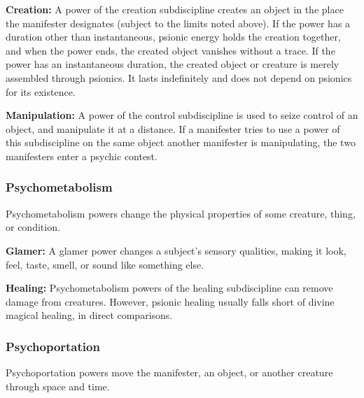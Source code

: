 \textbf{Creation:} A power of the creation subdiscipline creates an object in the place the manifester designates (subject to the limits noted above). If the power has a duration other than instantaneous, psionic energy holds the creation together, and when the power ends, the created object vanishes without a trace. If the power has an instantaneous duration, the created object or creature is merely assembled through psionics. It lasts indefinitely and does not depend on psionics for its existence.

\textbf{Manipulation:} A power of the control subdiscipline is used to seize control of an object, and manipulate it at a distance. If a manifester tries to use a power of this subdiscipline on the same object another manifester is manipulating, the two manifesters enter a psychic contest.


\subsubsection{Psychometabolism}
Psychometabolism powers change the physical properties of some creature, thing, or condition.


\textbf{Glamer:} A glamer power changes a subject's sensory qualities, making it look, feel, taste, smell, or sound like something else.

\textbf{Healing:} Psychometabolism powers of the healing subdiscipline can remove damage from creatures. However, psionic healing usually falls short of divine magical healing, in direct comparisons.

\subsubsection{Psychoportation}
Psychoportation powers move the manifester, an object, or another creature through space and time.


